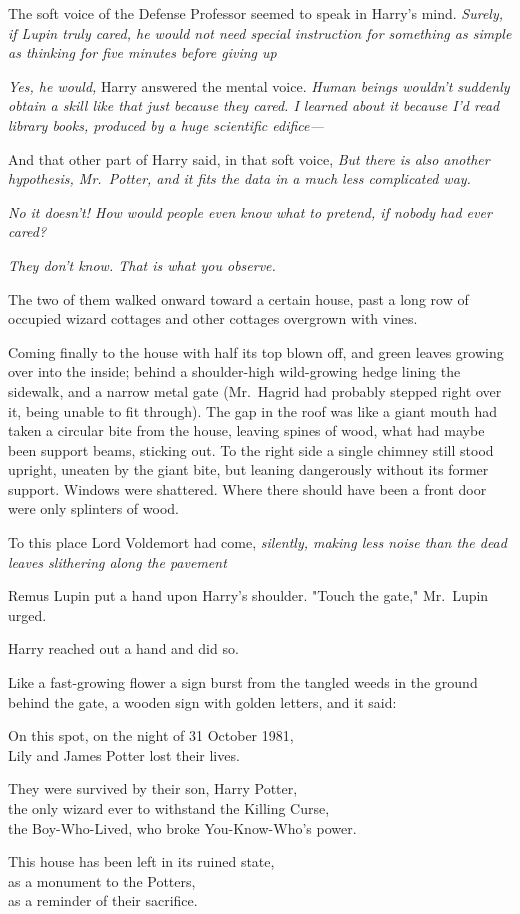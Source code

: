 The soft voice of the Defense Professor seemed to speak in Harry's mind.
\emph{Surely, if Lupin truly cared, he would not need special instruction for
something as simple as thinking for five minutes before giving up{\el}}

\emph{Yes, he would,} Harry answered the mental voice. \emph{Human beings
wouldn't suddenly obtain a skill like that just because they cared. I learned
about it because I'd read library books, produced by a huge scientific
edifice---}

And that other part of Harry said, in that soft voice, \emph{But there is also
another hypothesis, Mr.~Potter, and it fits the data in a much less complicated
way.}

\emph{No it doesn't! How would people even know what to pretend, if nobody had
ever cared?}

\emph{They don't know. That is what you observe.}

The two of them walked onward toward a certain house, past a long row of
occupied wizard cottages and other cottages overgrown with vines.

Coming finally to the house with half its top blown off, and green leaves
growing over into the inside; behind a shoulder-high wild-growing hedge lining
the sidewalk, and a narrow metal gate (Mr.~Hagrid had probably stepped right
over it, being unable to fit through). The gap in the roof was like a giant
mouth had taken a circular bite from the house, leaving spines of wood, what
had maybe been support beams, sticking out. To the right side a single chimney
still stood upright, uneaten by the giant bite, but leaning dangerously without
its former support. Windows were shattered. Where there should have been a
front door were only splinters of wood.

To this place Lord Voldemort had come, \emph{silently, making less noise than
the dead leaves slithering along the pavement{\el}}

Remus Lupin put a hand upon Harry's shoulder. "Touch the gate," Mr.~Lupin urged.

Harry reached out a hand and did so.

Like a fast-growing flower a sign burst from the tangled weeds in the ground
behind the gate, a wooden sign with golden letters, and it said:

\begin{center}
On this spot, on the night of 31 October 1981,\\
Lily and James Potter lost their lives.

They were survived by their son, Harry Potter,\\
the only wizard ever to withstand the Killing Curse,\\
the Boy-Who-Lived, who broke You-Know-Who's power.

This house has been left in its ruined state,\\
as a monument to the Potters,\\
as a reminder of their sacrifice.
\end{center}

